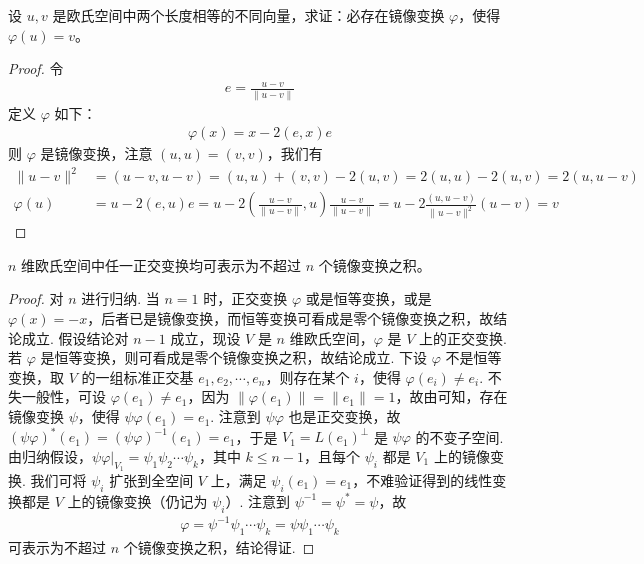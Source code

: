 \documentclass[../../main.tex]{subfiles}%
\begin{document}
\begin{proposition}\label{proposition:例9.42}
设 \(u,v\) 是欧氏空间中两个长度相等的不同向量，求证：必存在镜像变换 \(\varphi\)，使得 \(\varphi(u) = v\)。
\end{proposition}
\begin{proof}

令
\begin{align*}
e = \frac{u - v}{\|u - v\|}
\end{align*}
定义 \(\varphi\) 如下：
\begin{align*}
\varphi(x) = x - 2(e,x)e
\end{align*}
则 \(\varphi\) 是镜像变换，注意 \((u,u) = (v,v)\)，我们有
\begin{align*}
\|u - v\|^2 &= (u - v,u - v) = (u,u) + (v,v) - 2(u,v) = 2(u,u) - 2(u,v) = 2(u,u - v)\\
\varphi(u) &= u - 2(e,u)e = u - 2\left(\frac{u - v}{\|u - v\|},u\right)\frac{u - v}{\|u - v\|} = u - 2\frac{(u,u - v)}{\|u - v\|^2}(u - v) = v
\end{align*}

\end{proof}

\begin{proposition}\label{proposition:例9.43}
\(n\) 维欧氏空间中任一正交变换均可表示为不超过 \(n\) 个镜像变换之积。
\end{proposition}
\begin{proof}

对 \(n\) 进行归纳. 当 \(n = 1\) 时，正交变换 \(\varphi\) 或是恒等变换，或是 \(\varphi(x) = -x\)，后者已是镜像变换，而恒等变换可看成是零个镜像变换之积，故结论成立. 假设结论对 \(n - 1\) 成立，现设 \(V\) 是 \(n\) 维欧氏空间，\(\varphi\) 是 \(V\) 上的正交变换. 若 \(\varphi\) 是恒等变换，则可看成是零个镜像变换之积，故结论成立. 下设 \(\varphi\) 不是恒等变换，取 \(V\) 的一组标准正交基 \(e_1,e_2,\cdots,e_n\)，则存在某个 \(i\)，使得 \(\varphi(e_i) \neq e_i\). 不失一般性，可设 \(\varphi(e_1) \neq e_1\)，因为 \(\|\varphi(e_1)\| = \|e_1\| = 1\)，故由可知，存在镜像变换 \(\psi\)，使得 \(\psi\varphi(e_1) = e_1\). 注意到 \(\psi\varphi\) 也是正交变换，故 \((\psi\varphi)^*(e_1) = (\psi\varphi)^{-1}(e_1) = e_1\)，于是 \(V_1 = L(e_1)^{\perp}\) 是 \(\psi\varphi\) 的不变子空间. 由归纳假设，\(\psi\varphi|_{V_1} = \psi_1\psi_2\cdots\psi_k\)，其中 \(k \leqslant  n - 1\)，且每个 \(\psi_i\) 都是 \(V_1\) 上的镜像变换. 我们可将 \(\psi_i\) 扩张到全空间 \(V\) 上，满足 \(\psi_i(e_1) = e_1\)，不难验证得到的线性变换都是 \(V\) 上的镜像变换（仍记为 \(\psi_i\)）. 注意到 \(\psi^{-1} = \psi^* = \psi\)，故
\begin{align*}
\varphi = \psi^{-1}\psi_1\cdots\psi_k = \psi\psi_1\cdots\psi_k
\end{align*}
可表示为不超过 \(n\) 个镜像变换之积，结论得证. 

\end{proof}
\end{document}
